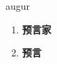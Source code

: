
\begin{frame}
{\huge augur}
\begin{center}
\begin{enumerate}\Large
  \item \textbf{预言家}
  \item \textbf{预言}
\end{enumerate}
\end{center}
\end{frame}

